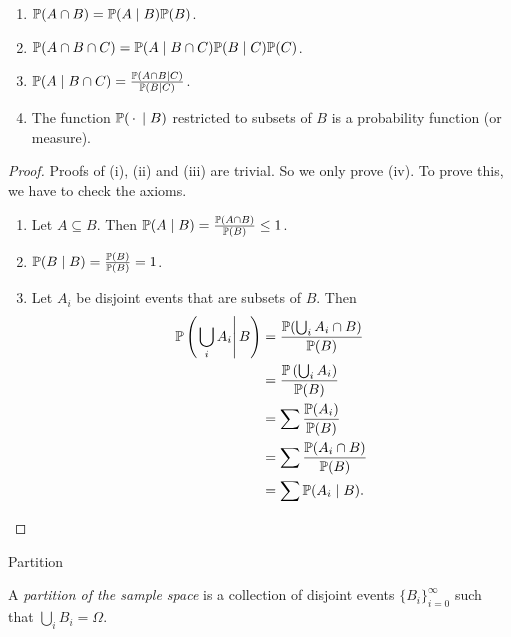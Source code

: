 %
\begin{note}
  \begin{field}
    \begin{thm}\leavevmode
      \begin{enumerate}
        \item $\P(A\cap B) = \P(A\mid B)\P(B)$.
        \item $\P(A\cap B\cap C) = \P(A\mid B\cap C) \P(B\mid C) \P(C)$.
        \item $\P(A\mid B\cap C) = \frac{\P(A\cap B\mid C)}{\P(B\mid C)}$.
        \item The function $\P(\ph \mid B)$ restricted to subsets of $B$ is a probability function (or measure).
      \end{enumerate}
    \end{thm}
  \end{field}
  \begin{field}
    \begin{proof}
      Proofs of (i), (ii) and (iii) are trivial. So we only prove (iv). To prove this, we have to check the axioms.
      \begin{enumerate}
        \item Let $A\subseteq B$. Then $\P(A\mid B) = \frac{\P(A\cap B)}{\P(B)} \leq 1$.
        \item $\P(B\mid B) = \frac{\P(B)}{\P(B)} = 1$.
        \item Let $A_i$ be disjoint events that are subsets of $B$. Then
          \begin{align*}
            \P\left(\left.\bigcup_i A_i\right\vert B\right) &= \frac{\P(\bigcup_i A_i\cap B)}{\P(B)}\\
            &= \frac{\P\left(\bigcup_i A_i\right)}{\P(B)}\\
            &= \sum \frac{\P(A_i)}{\P(B)}\\
            &=\sum \frac{\P(A_i\cap B)}{\P(B)}\\
            &= \sum \P(A_i \mid B).\qedhere
          \end{align*}%
      \end{enumerate}
    \end{proof}
  \end{field}
  \xplain{}%
\end{note}

%
\begin{note}
  \begin{field}
    Partition
  \end{field}
  \begin{field}
    \begin{defi}[Partition]
      A \emph{partition of the sample space} is a collection of disjoint events $\{B_i\}_{i = 0}^\infty$ such that $\bigcup_i B_i = \Omega$.
    \end{defi}
  \end{field}
  \xplain{}%
\end{note}

